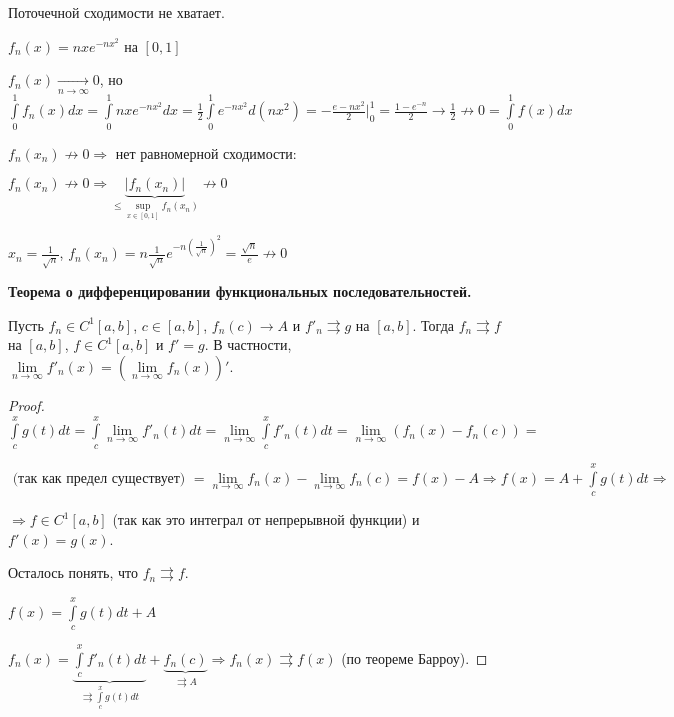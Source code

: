 \begin{remark}
    Поточечной сходимости не хватает.
    \begin{example}
        $f_n(x)=nxe^{-nx^2}$ на $[0, 1]$

        $f_n(x)\underset{n\rightarrow \infty}{\rightarrow} 0$, но $\int\limits_0^1 f_n(x)dx= \int\limits_0^1 nxe^{-nx^2}dx=\frac{1}{2}\int\limits_0^1 e^{-nx^2}d(nx^2)=-\frac{e-nx^2}{2}|_0^1=\frac{1-e^{-n}}{2}\rightarrow \frac{1}{2}\not\rightarrow 0=\int\limits_0^1 f(x)dx$
    \end{example}
    \begin{remark}
        $f_n(x_n)\not\rightarrow 0\Rightarrow$ нет равномерной сходимости:

        $f_n(x_n)\not\rightarrow 0\Rightarrow \underbrace{|f_n(x_n)|}_{\leq \sup\limits_{x\in [0, 1]}f_n(x_n)}\not \rightarrow 0$
    \end{remark}

    $x_n=\frac{1}{\sqrt{n}}$, $f_n(x_n)=n \frac{1}{\sqrt{n}}e^{-n(\frac{1}{\sqrt{n}})^2}=\frac{\sqrt{n}}{e}\not\rightarrow 0$
    
\end{remark}

\begin{theorem}
    \textbf{Теорема о дифференцировании функциональных последовательностей.}

    Пусть $f_n\in C^1[a, b]$, $c\in [a, b]$, $f_n(c)\rightarrow A$ и $f'_n\rightrightarrows g$ на $[a, b]$. Тогда $f_n\rightrightarrows f$ на $[a, b]$, $f\in C^1[a, b]$ и $f'=g$. В частности, $\lim\limits_{n\rightarrow \infty}f'_n(x)=(\lim\limits_{n\rightarrow \infty} f_n(x))'$.
\end{theorem}

\begin{proof}
    $\int\limits_c^x g(t)dt=\int\limits_c^x \lim\limits_{n\rightarrow \infty}f'_n(t)dt=\lim\limits_{n\rightarrow \infty}\int\limits_c^xf'_n(t)dt=\lim\limits_{n\rightarrow \infty} (f_n(x)-f_n(c))=$
    
    $\text{ (так как предел существует) }=\lim\limits_{n\rightarrow \infty}  f_n(x) - \lim\limits_{n\rightarrow \infty} f_n(c)=f(x)-A\Rightarrow f(x)=A+\int\limits_c^x g(t)dt\Rightarrow$
    
    $\Rightarrow f\in C^1[a, b]$ (так как это интеграл от непрерывной функции) и $f'(x)=g(x)$.

    Осталось понять, что $f_n\rightrightarrows f$.

    $f(x)=\int\limits_c^x g(t)dt+A$
    
    $f_n(x)=\underbrace{\int\limits_c^x f'_n(t)dt}_{\rightrightarrows \int\limits_c^x g(t)dt}+\underbrace{f_n(c)}_{\rightrightarrows A}\Rightarrow f_n(x)\rightrightarrows f(x)$ (по теореме Барроу).
\end{proof}

